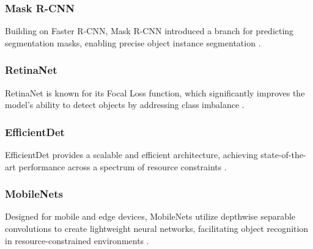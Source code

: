 \subsubsection{Mask R-CNN}
Building on Faster R-CNN, Mask R-CNN introduced a branch for predicting segmentation masks, enabling precise object instance segmentation \cite{He2017}.

\subsubsection{RetinaNet}
RetinaNet is known for its Focal Loss function, which significantly improves the model's ability to detect objects by addressing class imbalance \cite{Lin2017}.

\subsubsection{EfficientDet}
EfficientDet provides a scalable and efficient architecture, achieving state-of-the-art performance across a spectrum of resource constraints \cite{Tan2020}.

\subsubsection{MobileNets}
Designed for mobile and edge devices, MobileNets utilize depthwise separable convolutions to create lightweight neural networks, facilitating object recognition in resource-constrained environments \cite{Howard2017}.



